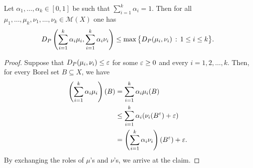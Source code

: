 \begin{lem}\label{szac}
Let $\alpha_1,\ldots,\alpha_k \in[0,1]$ be  such that $\sum_{i=1}^k\alpha_i=1$.
%
Then for all $\mu_1,\ldots,\mu_k,\nu_1,\ldots,\nu_k\in\mathcal M(X)$ one has 
$$D_P\left(\sum_{i=1}^k\alpha_i\mu_i,\sum_{i=1}^k\alpha_i\nu_i\right)\leq \max\big\{D_P(\mu_i,\nu_i)\,:\,1\leq i\leq k\big\}.$$
\end{lem}
\begin{proof}
Suppose that $D_P(\mu_i, \nu_i)\leq \varepsilon$ for some $\varepsilon\geq 0$ and every $i=1,2, \ldots, k$. Then, for every Borel set $B\subseteq X$, we have
\begin{align*}
\left(\sum_{i=1}^k\alpha_i\mu_i\right)(B) &=\sum_{i=1}^k \alpha_i \mu_i(B) \\
& \leq \sum_{i=1}^k \alpha_i(\nu_i(B^\varepsilon)+\varepsilon)\\ 
&= \left(\sum_{i=1}^k \alpha_i \nu_i\right)(B^\varepsilon) + \varepsilon.
\end{align*}
By exchanging the roles of $\mu$'s and $\nu$'s, we arrive at the claim.
\end{proof}

